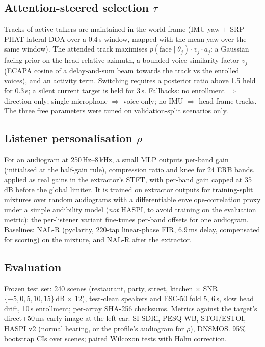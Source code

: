 \subsection{Attention-steered selection $\tau$}
Tracks of active talkers are maintained in the world frame (IMU yaw $+$ SRP-PHAT lateral DOA over a
0.4\,s window, mapped with the mean yaw over the same window). The attended track maximises
$p(\text{face}\mid\theta_j)\cdot v_j\cdot a_j$: a Gaussian facing prior on the head-relative azimuth,
a bounded voice-similarity factor $v_j$ (ECAPA cosine of a delay-and-sum beam towards the track vs the
enrolled voices), and an activity term. Switching requires a posterior ratio above 1.5 held for 0.3\,s;
a silent current target is held for 3\,s. Fallbacks: no enrollment $\Rightarrow$ direction only;
single microphone $\Rightarrow$ voice only; no IMU $\Rightarrow$ head-frame tracks. The three free
parameters were tuned on validation-split scenarios only.
\subsection{Listener personalisation $\rho$}
For an audiogram at 250\,Hz--8\,kHz, a small MLP outputs per-band gain (initialised at the half-gain
rule), compression ratio and knee for 24 ERB bands, applied as real gains in the extractor's STFT, with
per-band gain capped at 35\,dB before the global limiter. It is trained on extractor outputs for
training-split mixtures over random audiograms with a differentiable envelope-correlation proxy under a
simple audibility model (\emph{not} HASPI, to avoid training on the evaluation metric); the
per-listener variant fine-tunes per-band offsets for one audiogram. Baselines: NAL-R (pyclarity,
220-tap linear-phase FIR, 6.9\,ms delay, compensated for scoring) on the mixture, and NAL-R after the
extractor.
\subsection{Evaluation}
Frozen test set: 240 scenes (restaurant, party, street, kitchen $\times$ SNR $\{-5,0,5,10,15\}$\,dB
$\times$ 12), test-clean speakers and ESC-50 fold 5, 6\,s, slow head drift, 10\,s enrollment; per-array
SHA-256 checksums. Metrics against the target's direct+50\,ms early image at the left ear: SI-SDRi,
PESQ-WB, STOI/ESTOI, HASPI v2 (normal hearing, or the profile's audiogram for $\rho$), DNSMOS. 95\%
bootstrap CIs over scenes; paired Wilcoxon tests with Holm correction.
